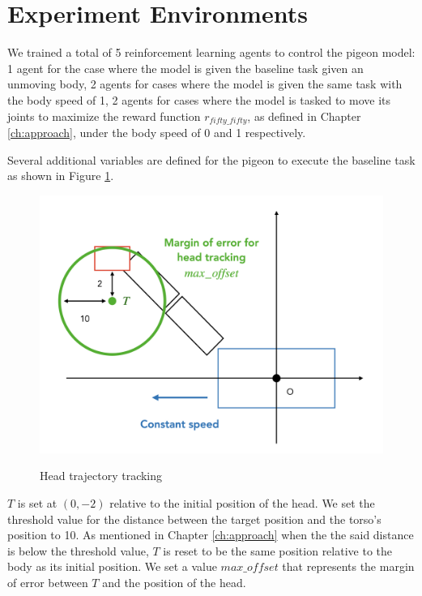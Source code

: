 \section{Experiment Environments}
  We trained a total of 5 reinforcement learning agents to control the pigeon model: 1 agent for the case where the model is given the baseline task given an unmoving body, 2 agents for cases where the model is given the same task with the body speed of 1, 2 agents for cases where the model is tasked to move its joints to maximize the reward function $r_{fifty\_fifty}$, as defined in Chapter \ref{ch:approach}, under the body speed of 0 and 1 respectively.

    Several additional variables are defined for the pigeon to execute the baseline task as shown in Figure \ref{fig:pigeon_target}.
      \begin{figure}[H]
          \centering
          \includegraphics[width=1\textwidth]{figures/pigeon_diagram/pigeon_diagram_002.png}
          \label{fig:pigeon_target}
          \caption{Head trajectory tracking}
      \end{figure}
    $T$ is set at $(0, -2)$ relative to the initial position of the head.
    We set the threshold value for the distance between the target position and the torso's position to 10. As mentioned in Chapter \ref{ch:approach} when the the said distance is below the threshold value, $T$ is reset to be the same position relative to the body as its initial position.
    We set a value $max\_offset$ that represents the margin of error between $T$ and the position of the head.

